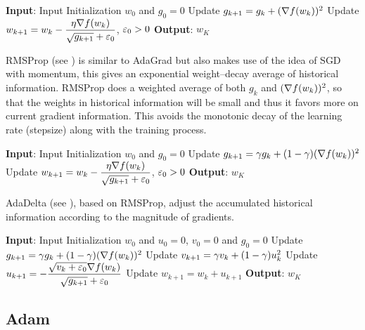 \begin{algorithm}[H]
\caption{AdaGrad}
\label{Alg:AdaGrad}
\begin{algorithmic}[1]
\STATE \textbf{Input}: Input Initialization $w_0$ and $g_0=0$
    \STATE Update $g_{k+1}=g_k+(\nabla f(w_k))^2$
    \STATE Update $w_{k+1}=w_k-\dfrac{\eta \nabla f(w_k)}{\sqrt{g_{k+1}}+\varepsilon_0}$, $\varepsilon_0>0$
\ENDFOR
\STATE \textbf{Output}: $w_K$
\end{algorithmic}
\end{algorithm}


RMSProp (see \cite{tieleman2012rmsprop}) is similar to AdaGrad but also makes use of the idea of SGD with momentum, this gives an 
exponential weight--decay average of historical information. RMSProp does a weighted average of both $g_k$
and $(\nabla f(w_k))^2$, so that the weights in historical information will be small and thus it favors more on
current gradient information. This avoids the monotonic decay of the learning rate (stepsize) along with the training process.

\begin{algorithm}[H]
\caption{RMSProp}
\label{Alg:RMSProp}
\begin{algorithmic}[1]
\STATE \textbf{Input}: Input Initialization $w_0$ and $g_0=0$
    \STATE Update $g_{k+1}=\gamma g_k+(1-\gamma)(\nabla f(w_k))^2$
    \STATE Update $w_{k+1}=w_k-\dfrac{\eta \nabla f(w_k)}{\sqrt{g_{k+1}}+\varepsilon_0}$, $\varepsilon_0>0$
\ENDFOR
\STATE \textbf{Output}: $w_K$
\end{algorithmic}
\end{algorithm}

AdaDelta (see \cite{zeiler2012adadelta}), based on RMSProp, adjust the accumulated historical information according to the magnitude of gradients.

\begin{algorithm}[H]
\caption{AdaDelta}
\label{Alg:AdaDelta}
\begin{algorithmic}[1]
\STATE \textbf{Input}: Input Initialization $w_0$ and $u_0=0$, $v_0=0$ and $g_0=0$
    \STATE Update $g_{k+1}=\gamma g_k+(1-\gamma)(\nabla f(w_k))^2$
    \STATE Update $v_{k+1}=\gamma v_k+(1-\gamma)u_k^2$
    \STATE Update $u_{k+1}=-\dfrac{\sqrt{v_k+\varepsilon_0}\nabla f(w_k)}{\sqrt{g_{k+1}}+\varepsilon_0}$
    \STATE Update $w_{k+1}=w_k+u_{k+1}$
\ENDFOR
\STATE \textbf{Output}: $w_K$
\end{algorithmic}
\end{algorithm}

\subsection{Adam}

